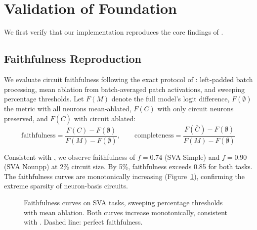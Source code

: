 \documentclass[11pt]{article}
\begin{document}
\section{Validation of Foundation}
\label{sec:validation}

We first verify that our implementation reproduces the core findings of \citet{arora2025circuits}.

\subsection{Faithfulness Reproduction}
\label{sec:faithfulness}

We evaluate circuit faithfulness following the exact protocol of \citet{arora2025circuits}: left-padded batch processing, mean ablation from batch-averaged patch activations, and sweeping percentage thresholds.
Let $F(M)$ denote the full model's logit difference, $F(\emptyset)$ the metric with all neurons mean-ablated, $F(C)$ with only circuit neurons preserved, and $F(\bar{C})$ with circuit ablated:
\begin{equation}
    \text{faithfulness} = \frac{F(C) - F(\emptyset)}{F(M) - F(\emptyset)}, \qquad
    \text{completeness} = \frac{F(\bar{C}) - F(\emptyset)}{F(M) - F(\emptyset)}
\end{equation}

Consistent with \citet{arora2025circuits}, we observe faithfulness of $f{=}0.74$ (SVA Simple) and $f{=}0.90$ (SVA Nounpp) at 2\% circuit size.
By 5\%, faithfulness exceeds 0.85 for both tasks.
The faithfulness curves are monotonically increasing (Figure~\ref{fig:faithfulness}), confirming the extreme sparsity of neuron-basis circuits.

\begin{figure}[htbp]
\centering
{}
\caption{Faithfulness curves on SVA tasks, sweeping percentage thresholds with mean ablation. Both curves increase monotonically, consistent with \citet{arora2025circuits}. Dashed line: perfect faithfulness.}
\label{fig:faithfulness}
\end{figure}
\end{document}
